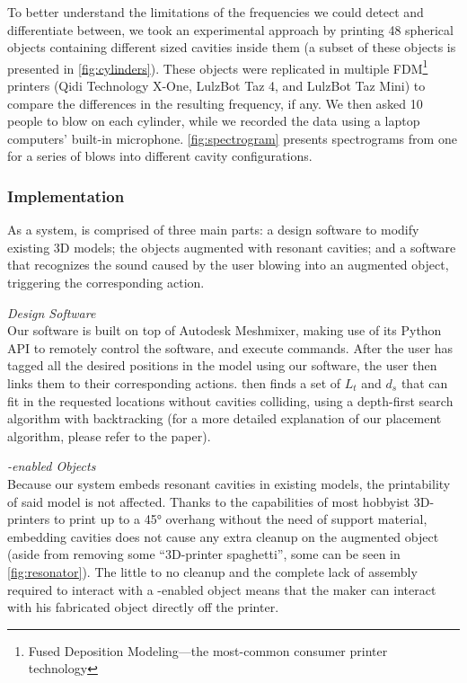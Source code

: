         To better understand the limitations of the frequencies we could detect
        and differentiate between, we took an experimental approach by printing
        48 spherical objects containing different sized cavities inside them (a
        subset of these objects is presented in \cref{fig:cylinders}).  These
        objects were replicated in multiple FDM\footnote{Fused Deposition
        Modeling---the most-common consumer printer technology} printers (Qidi
        Technology X-One, LulzBot Taz 4, and LulzBot Taz Mini) to compare the
        differences in the resulting frequency, if any. We then asked 10 people
        to blow on each cylinder, while we recorded the data using a laptop
        computers' built-in microphone.  \cref{fig:spectrogram} presents
        spectrograms from one for a series of blows into different cavity
        configurations.

        \subsubsection{Implementation}
          As a system, \bh is comprised of three main parts: a design software
          to modify existing 3D models; the objects augmented with resonant
          cavities; and a software that recognizes the sound caused by the user
          blowing into an augmented object, triggering the corresponding
          action.

          \textit{Design Software}\\
            Our software is built on top of Autodesk Meshmixer, making use of
            its Python API to remotely control the software, and execute
            commands.  After the user has tagged all the desired positions in
            the model using our software, the user then links them to their
            corresponding actions. \bh then finds a set of $L_t$ and $d_s$ that
            can fit in the requested locations without cavities colliding,
            using a depth-first search algorithm with backtracking (for a more
            detailed explanation of our placement algorithm, please refer to
            the paper).

          \textit{\bh-enabled Objects}\\
            Because our system embeds resonant cavities in existing models, the
            printability of said model is not affected. Thanks to the
            capabilities of most hobbyist 3D-printers to print up to a 45°
            overhang without the need of support material, embedding \bh
            cavities does not cause any extra cleanup on the augmented object
            (aside from removing some ``3D-printer spaghetti'', some can be
            seen in \cref{fig:resonator}). The little to no cleanup and the
            complete lack of assembly required to interact with a \bh-enabled
            object means that the maker can interact with his fabricated object
            directly off the printer.

